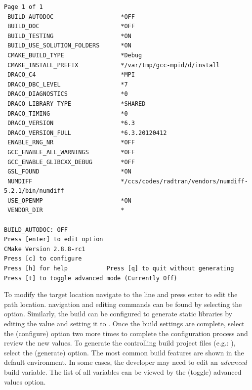 \begin{lstlisting}[basicstyle=\footnotesize, xleftmargin=0.0in, xrightmargin=0.0in]
                                                     Page 1 of 1
 BUILD_AUTODOC                   *OFF                                                    
 BUILD_DOC                       *OFF                                                    
 BUILD_TESTING                   *ON                                                     
 BUILD_USE_SOLUTION_FOLDERS      *ON                                                     
 CMAKE_BUILD_TYPE                *Debug                                                  
 CMAKE_INSTALL_PREFIX            */var/tmp/gcc-mpid/d/install                        
 DRACO_C4                        *MPI                                                    
 DRACO_DBC_LEVEL                 *7                                                      
 DRACO_DIAGNOSTICS               *0                                                      
 DRACO_LIBRARY_TYPE              *SHARED                                                 
 DRACO_TIMING                    *0                                                      
 DRACO_VERSION                   *6.3                                                    
 DRACO_VERSION_FULL              *6.3.20120412                                           
 ENABLE_RNG_NR                   *OFF                                                    
 GCC_ENABLE_ALL_WARNINGS         *OFF                                                    
 GCC_ENABLE_GLIBCXX_DEBUG        *OFF                                                    
 GSL_FOUND                       *ON                                                     
 NUMDIFF                         */ccs/codes/radtran/vendors/numdiff-5.2.1/bin/numdiff   
 USE_OPENMP                      *ON                                                     
 VENDOR_DIR                      *              

BUILD_AUTODOC: OFF                                                                                                                                                         
Press [enter] to edit option                                       CMake Version 2.8.8-rc1
Press [c] to configure
Press [h] for help           Press [q] to quit without generating
Press [t] to toggle advanced mode (Currently Off)
\end{lstlisting}
To modify the target location navigate to the  line and press enter to edit the path location.   navigation and editing commands can
be found by selecting the \comp{[h]} option.  Similarly, the build can be configured to generate static libraries by editing the  value and setting it to .  Once the build settings are complete, select the \comp{[c]} (configure) option two more times to complete the configuration process and review the new values.    To generate the controlling build project files (e.g.: ), select the \comp{[g]} (generate) option.  The most common build features are shown in the default  environment.  In some cases, the developer may need to edit an {\it advanced} build variable.  The list of all variables can be viewed by the \comp{[t]} (toggle) advanced values option.

